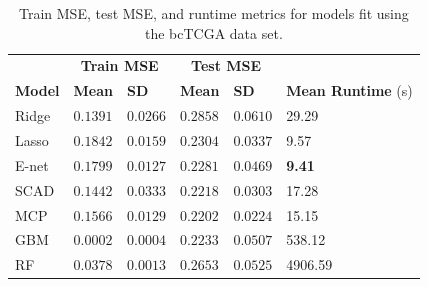 \documentclass{article}
\begin{document}
	\begin{table}[h!]
		\centering
		\captionsetup{width = 5in}
		\caption{Train MSE, test MSE, and runtime metrics for models fit using the bcTCGA data set.}
		\label{tab:emp_results}
		\begin{tabular}{l|ll|ll|l}
			\hline
			& \multicolumn{2}{c|}{\textbf{Train MSE}} & \multicolumn{2}{c|}{\textbf{Test MSE}} &  \\ 
			\textbf{Model } & \textbf{Mean} & \textbf{SD} & \textbf{Mean} & \textbf{SD} & \textbf{Mean Runtime} (s) \\ 
			\hline
			Ridge  & $0.1391$ & $0.0266$ & $0.2858$ & $0.0610$ & 29.29\\
			Lasso  & $0.1842$ & $0.0159$ & $0.2304$ & $0.0337$ & 9.57\\
			E-net  & $0.1799$ & $0.0127$ & $0.2281$ & $0.0469$ & \textbf{9.41}\\
			SCAD  & $0.1442$ & $0.0333$ & $0.2218$ & $0.0303$ & 17.28\\
			MCP  & $0.1566$ & $0.0129$ & $\mathbf{0.2202}$ & $\mathbf{0.0224}$ & 15.15\\
			GBM  & $\mathbf{0.0002}$ & $\mathbf{0.0004}$ & $0.2233$ & $0.0507$ & 538.12\\
			RF  & $0.0378$ & $0.0013$ & $0.2653$ & $0.0525$ & 4906.59\\
			\hline 
		\end{tabular}
	\end{table}
	
\end{document}
